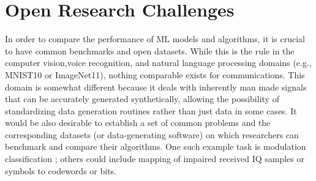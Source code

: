 \chapter{Open Research Challenges}

In order to compare the performance of ML models and algorithms, it is crucial to have common benchmarks and open datasets. While this is the rule in the computer vision,voice recognition, and natural language processing domains (e.g., MNIST10 or ImageNet11), nothing comparable exists for communications. This domain is somewhat different because it deals with inherently man made signals that can be accurately generated synthetically, allowing the possibility of standardizing data generation routines rather than just data in some cases. It would be also desirable to establish a set of common problems and the corresponding datasets (or data-generating software) on which researchers can benchmark and compare their algorithms. One such example task is modulation classification ; others could include mapping of impaired received IQ samples or symbols to codewords or bits.